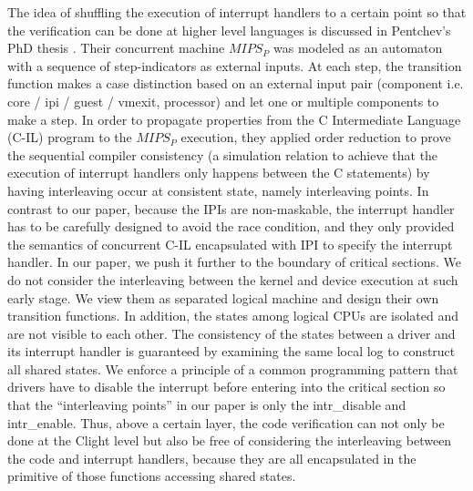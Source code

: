 The idea of shuffling the execution of interrupt handlers to a certain point
so that the verification can be done at higher level languages is discussed in
Pentchev's PhD thesis \cite{Pentchev:2016}. Their concurrent machine $MIPS_{P}$
was modeled as an
automaton with a sequence of step-indicators as external inputs. At each step,
the transition function makes a case distinction based on an external input
pair (component i.e. core / ipi / guest / vmexit, processor) and let one or
multiple components to make a step. In order to propagate properties from the C
Intermediate Language (C-IL) program to the $MIPS_{P}$ execution, they applied
order reduction to prove the sequential compiler consistency (a simulation
relation to achieve that the execution of interrupt handlers only happens
between the C statements) by having interleaving occur at consistent state,
namely interleaving points. In contrast to our paper, because the IPIs are
non-maskable, the interrupt handler has to be carefully designed to avoid the
race condition, and they only provided the semantics of concurrent C-IL
encapsulated with IPI to specify the interrupt handler. In our paper, we push
it further to the boundary of critical sections. We do not consider the
interleaving between the kernel and device execution at such early stage. We
view them as separated logical machine and design their own transition functions.
In addition, the states among logical CPUs are isolated and are not visible
to each other. The consistency of the states between a driver and its
interrupt handler is guaranteed by examining the same local log to construct
all shared states. We enforce a principle of a common programming pattern that
drivers have to disable the interrupt before entering into the critical section
so that the ``interleaving points'' in our paper is only the \textsf{intr\_disable} and
\textsf{intr\_enable}. Thus, above a certain layer, the code verification can not only
be done at the Clight level but also be free of considering the interleaving between
the code and interrupt handlers, because they are all encapsulated in the primitive of
those functions accessing shared states.

